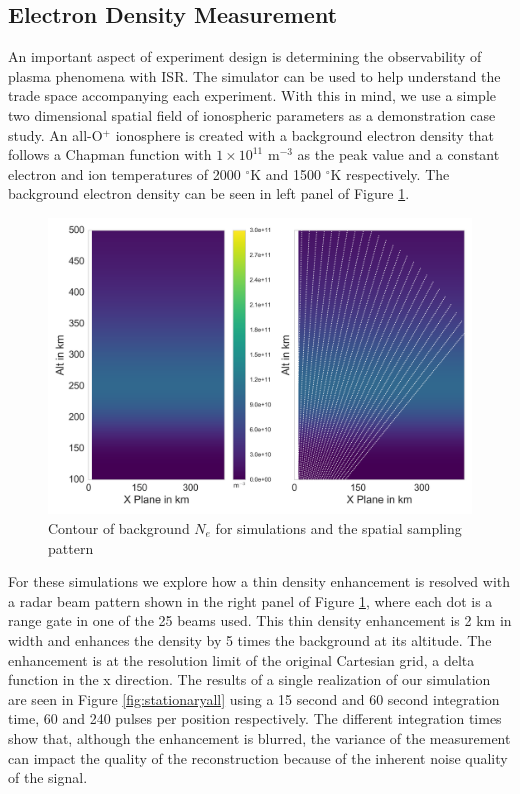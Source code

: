 \documentclass[draft,ras]{agutex}
\begin{document}
\begin{article}
\subsection{Electron Density Measurement}
An important aspect of experiment design is determining the observability of plasma phenomena with ISR. The simulator can be used to help understand the trade space accompanying each experiment. With this in mind, we use a simple two dimensional spatial field of ionospheric parameters as a demonstration case study. An all-O$^+$ ionosphere is created with a background electron density that follows a Chapman function with $1\times10^{11}$ m$^{-3}$ as the peak value and a constant electron and ion temperatures of 2000 $^\circ$K and 1500 $^\circ$K respectively. The background electron density can be seen in left panel of  Figure \ref{fig:background1}.

\begin{figure}[!t]
\centering
\includegraphics[width=6in]{backgroundandsamp}
\caption{Contour of background $N_e$ for simulations and the spatial sampling pattern}
\label{fig:background1}
\end{figure}

For these simulations we explore how a thin density enhancement is resolved with a radar beam pattern shown in the right panel of Figure \ref{fig:background1}, where each dot is a range gate in one of the 25 beams used. This thin density enhancement is 2 km in width and enhances the density by 5 times the background at its altitude. The enhancement is at the resolution limit of the original Cartesian grid, a delta function in the x direction. The results of a single realization of our simulation are seen in Figure \ref{fig:stationaryall} using a 15 second and 60 second integration time, 60 and 240 pulses per position respectively. The different integration times show that, although the enhancement is blurred, the variance of the measurement can impact the quality of the reconstruction because of the inherent noise quality of the signal.


\end{article}
\end{document}

